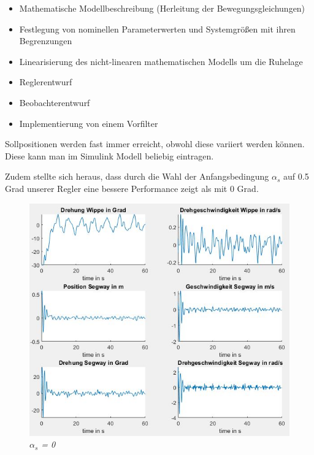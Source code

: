 \documentclass[pdf]{ifacconf}
\begin{document}
\begin{itemize}
\item Mathematische Modellbeschreibung (Herleitung der Bewegungsgleichungen)  
\item Festlegung von nominellen Parameterwerten und Systemgrößen mit ihren Begrenzungen  
\item Linearisierung des nicht-linearen mathematischen Modells um die Ruhelage
\item Reglerentwurf
\item Beobachterentwurf
\item Implementierung von einem Vorfilter
\end{itemize}

Sollpositionen werden fast immer erreicht, obwohl diese variiert werden können. Diese kann man im Simulink Modell beliebig eintragen.

Zudem stellte sich heraus, dass durch die Wahl der Anfangsbedingung $\alpha^{}_{s}$ auf 0.5 Grad unserer Regler eine bessere Performance zeigt als mit 0 Grad.  

\begin{figure}[h]	
\centerline{\includegraphics[width=\linewidth]{Bilder/Alf0undRef0.jpg}}
	\label{fig:Alf0undRef0}
	\caption{\textit{$\alpha^{}_{s}$ = 0}}
\end{figure}
\end{document}
